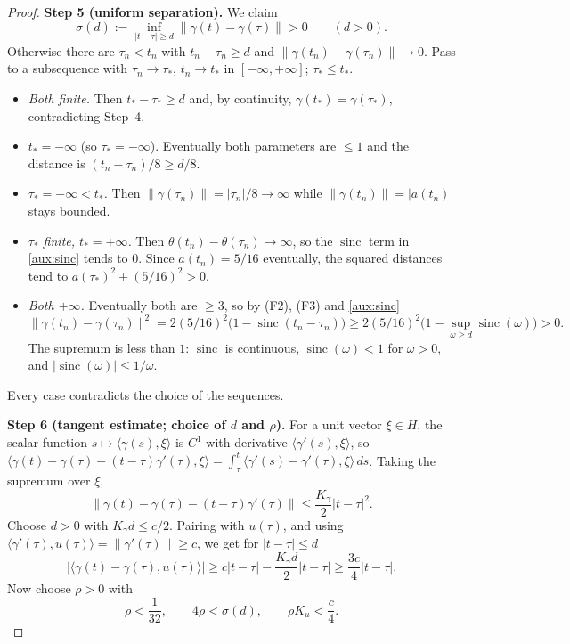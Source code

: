\documentclass[11pt]{article}
\newcommand{\norm}[1]{\lVert #1\rVert}
\newcommand{\ip}[2]{\langle #1,#2\rangle}
\DeclareMathOperator{\sinc}{sinc}
\theoremstyle{definition}
\numberwithin{equation}{section}
\newcommand{\step}[1]{\par\smallskip\noindent\textbf{Step #1.}\enspace}
\begin{document}
\begin{proof}
\step{5 (uniform separation)}
We claim
\begin{equation}\label{aux:separation}
 \sigma(d):=\inf_{|t-\tau|\ge d}\norm{\gamma(t)-\gamma(\tau)}>0
 \qquad(d>0).
\end{equation}
Otherwise there are \(\tau_n<t_n\) with \(t_n-\tau_n\ge d\) and
\(\norm{\gamma(t_n)-\gamma(\tau_n)}\to0\). Pass to a subsequence with
\(\tau_n\to\tau_*\), \(t_n\to t_*\) in \([-\infty,+\infty]\);
\(\tau_*\le t_*\).
\begin{itemize}
\item \emph{Both finite.} Then \(t_*-\tau_*\ge d\) and, by continuity,
\(\gamma(t_*)=\gamma(\tau_*)\), contradicting Step~4.
\item \emph{\(t_*=-\infty\)} (so \(\tau_*=-\infty\)). Eventually both
parameters are \(\le1\) and the distance is \((t_n-\tau_n)/8\ge d/8\).
\item \emph{\(\tau_*=-\infty<t_*\).} Then
\(\norm{\gamma(\tau_n)}=|\tau_n|/8\to\infty\) while
\(\norm{\gamma(t_n)}=|a(t_n)|\) stays bounded.
\item \emph{\(\tau_*\) finite, \(t_*=+\infty\).} Then
\(\theta(t_n)-\theta(\tau_n)\to\infty\), so the \(\sinc\) term in
\eqref{aux:sinc} tends to \(0\). Since \(a(t_n)=5/16\) eventually, the
squared distances tend to \(a(\tau_*)^2+(5/16)^2>0\).
\item \emph{Both \(+\infty\).} Eventually both are \(\ge3\), so by (F2),
(F3) and \eqref{aux:sinc}
\[
 \norm{\gamma(t_n)-\gamma(\tau_n)}^2
 =2(5/16)^2\bigl(1-\sinc(t_n-\tau_n)\bigr)
 \ge2(5/16)^2\bigl(1-\sup_{\omega\ge d}\sinc(\omega)\bigr)>0.
\]
The supremum is less than \(1\): \(\sinc\) is continuous, \(\sinc(\omega)<1\)
for \(\omega>0\), and \(|\sinc(\omega)|\le1/\omega\).
\end{itemize}
Every case contradicts the choice of the sequences.

\step{6 (tangent estimate; choice of \(d\) and \(\rho\))}
For a unit vector \(\xi\in H\), the scalar function
\(s\mapsto\ip{\gamma(s)}{\xi}\) is \(C^1\) with derivative
\(\ip{\gamma'(s)}{\xi}\), so
\(\ip{\gamma(t)-\gamma(\tau)-(t-\tau)\gamma'(\tau)}{\xi}
=\int_\tau^t\ip{\gamma'(s)-\gamma'(\tau)}{\xi}\,ds\). Taking the supremum
over \(\xi\),
\[
 \norm{\gamma(t)-\gamma(\tau)-(t-\tau)\gamma'(\tau)}
 \le\frac{K_\gamma}2|t-\tau|^2 .
\]
Choose \(d>0\) with \(K_\gamma d\le c/2\). Pairing with \(u(\tau)\), and
using \(\ip{\gamma'(\tau)}{u(\tau)}=\norm{\gamma'(\tau)}\ge c\), we get for
\(|t-\tau|\le d\)
\begin{equation}\label{aux:tangent}
 |\ip{\gamma(t)-\gamma(\tau)}{u(\tau)}|
 \ge c|t-\tau|-\frac{K_\gamma d}{2}|t-\tau|
 \ge\frac{3c}{4}|t-\tau|.
\end{equation}
Now choose \(\rho>0\) with
\begin{equation}\label{aux:radius}
 \rho<\frac1{32},\qquad 4\rho<\sigma(d),\qquad \rho K_u<\frac c4.
\end{equation}


\end{proof}
\end{document}
